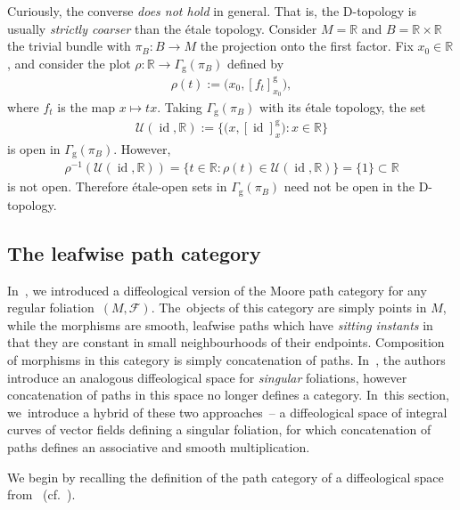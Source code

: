 \documentclass[pdftex]{sigma}
\numberwithin{equation}{section}
\def\g{\operatorname{g}}
\def\id{\operatorname{id}}
\def\FF{{\mathcal{F}}}
\def\UU{{\mathcal{U}}}
\def\RB{{\mathbb{R}}}
\begin{document}
\begin{Remark}
Curiously, the converse \textit{does not hold} in general. That is, the D-topology is usually \textit{strictly coarser} than the \'{e}tale topology. Consider $M = \RB$ and $B=\RB\times\RB$ the trivial bundle with $\pi_{B}\colon B\rightarrow M$ the projection onto the first factor. Fix $x_{0}\in\RB$, and consider the plot $\rho\colon \RB\rightarrow\Gamma_{\g}(\pi_{B})$ defined by
\begin{gather*}
\rho(t):=\big(x_{0},[f_{t}]^{\g}_{x_{0}}\big),
\end{gather*}
where $f_{t}$ is the map $x\mapsto tx$. Taking $\Gamma_{\g}(\pi_{B})$ with its \'{e}tale topology, the set
\begin{gather*}
\UU(\id,\RB):=\big\{\big(x,[\id]^{\g}_{x}\big)\colon x\in\RB\big\}
\end{gather*}
is open in $\Gamma_{\g}(\pi_{B})$. However,
\begin{gather*}
\rho^{-1}(\UU(\id,\RB)) = \{t\in\RB\colon \rho(t)\in\UU(\id,\RB)\} = \{1\}\subset\RB
\end{gather*}
is not open. Therefore \'{e}tale-open sets in $\Gamma_{\g}(\pi_{B})$ need not be open in the D-topology.
\end{Remark}

\subsection{The leafwise path category}

In~\cite{mac3}, we introduced a diffeological version of the Moore path category for any regular folia\-tion~$(M,\FF)$. The~objects of this category are simply points in $M$, while the morphisms are smooth, leafwise paths which have \textit{sitting instants} in that they are constant in small neighbourhoods of their endpoints. Composition of morphisms in this category is simply concatenation of paths. In~\cite{VilGar1}, the authors introduce an analogous diffeological space for \textit{singular} foliations, however concatenation of paths in this space no longer defines a category. In~this section, we~intro\-duce a hybrid of these two approaches~-- a diffeological space of integral curves of vector fields defining a singular foliation, for which concatenation of paths defines an associative and smooth multiplication.

We begin by recalling the definition of the path category of a diffeological space from~\cite{mac3} (cf.~\cite{ptfunctor}).
\end{document}

